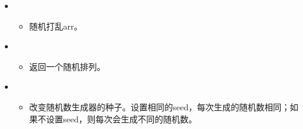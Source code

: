 \documentclass[letterpaper,10pt,english]{sphinxmanual}
\begin{document}
\begin{itemize}
\begin{itemize}
\end{itemize}

\item {} 
\begin{itemize}
\item {} 
随机打乱arr。

\end{itemize}

\item {} 
\begin{itemize}
\item {} 
返回一个随机排列。

\end{itemize}

\item {} 
\begin{itemize}
\item {} 
改变随机数生成器的种子。设置相同的seed，每次生成的随机数相同；如果不设置seed，则每次会生成不同的随机数。

\end{itemize}

\end{itemize}
\end{document}
